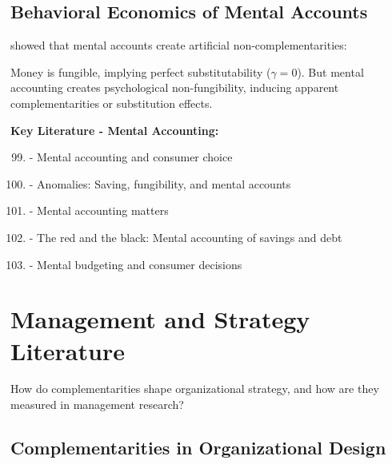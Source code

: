 \subsection{Behavioral Economics of Mental Accounts}
\label{subsec:mental-accounts}

\citet{thaler1985} showed that mental accounts create artificial non-complementarities:

\begin{finding}
Money is fungible, implying perfect substitutability ($\gamma = 0$). But mental accounting creates psychological non-fungibility, inducing apparent complementarities or substitution effects.
\end{finding}

\textbf{Key Literature - Mental Accounting:}
\begin{enumerate}[noitemsep]
    \setcounter{enumi}{98}
    \item \citet{thaler1985} - Mental accounting and consumer choice
    \item \citet{thaler1990} - Anomalies: Saving, fungibility, and mental accounts
    \item \citet{thaler1999mentalaccounting} - Mental accounting matters
    \item \citet{prelec1998} - The red and the black: Mental accounting of savings and debt
    \item \citet{heath1995} - Mental budgeting and consumer decisions
\end{enumerate}

\section{Management and Strategy Literature}
\label{sec:management}

\begin{tcolorbox}[colback=yellow!5!white,colframe=yellow!75!black,title=\textbf{Fundamental Question}]
How do complementarities shape organizational strategy, and how are they measured in management research?
\end{tcolorbox}

\subsection{Complementarities in Organizational Design}
\label{subsec:org-design}

